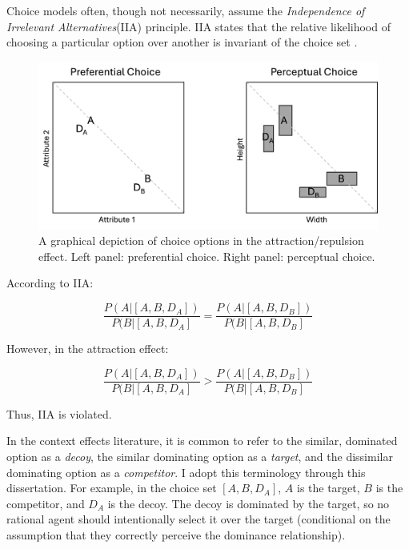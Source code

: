 Choice models often, though not necessarily, assume the \textit{Independence of Irrelevant Alternatives}(IIA) principle. IIA states that the relative likelihood of choosing a particular option over another is invariant of the choice set \parencite{ray1973independence}. 

\begin{figure}
   \includegraphics[width=\linewidth]{figures/pref_v_percep.jpg}
   \caption{A graphical depiction of choice options in the attraction/repulsion effect. Left panel: preferential choice. Right panel: perceptual choice.}
   \label{fig:fig_opts}
\end{figure}

According to IIA:

\begin{equation}
  \frac{P(A|[A,B,D_{A}])}{P(B|[A,B,D_{A}]}=\frac{P(A|[A,B,D_{B}])}{P(B|[A,B,D_{B}]}
  \label{eqn:iia}
\end{equation}

However, in the attraction effect:

\begin{equation}
  \frac{P(A|[A,B,D_{A}])}{P(B|[A,B,D_{A}]}>\frac{P(A|[A,B,D_{B}])}{P(B|[A,B,D_{B}]}
  \label{eqn:iia_att}
\end{equation}

Thus, IIA is violated.

In the context effects literature, it is common to refer to the similar, dominated option as a \textit{decoy}, the similar dominating option as a \textit{target}, and the dissimilar dominating option as a \textit{competitor}. I adopt this terminology through this dissertation. For example, in the choice set $[A,B,D_{A}]$, $A$ is the target, $B$ is the competitor, and $D_{A}$ is the decoy.  The decoy is dominated by the target, so no rational agent should intentionally select it over the target (conditional on the assumption that they correctly perceive the dominance relationship).  

